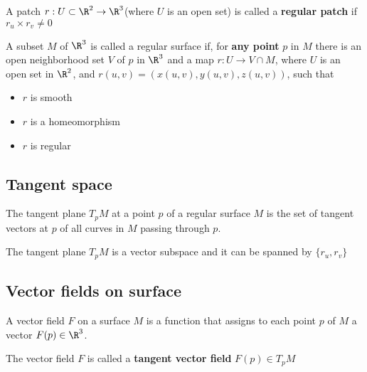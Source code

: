 \begin{refsection}
\begin{definition}\cite[135]{krim2015geometric}
A patch $r:U\subset \R^2 \to \R^3$(where $U$ is an open set) is called a \textbf{regular patch} if $r_u\times r_v \neq 0$
\end{definition}






\begin{definition}\cite[135]{krim2015geometric}
A subset $M$ of $\R^3$ is called a regular surface if, for \textbf{any point} $p$ in $M$ there is an open neighborhood set $V$ of $p$ in $\R^3$ and a map $r:U\to V\cap M$, where $U$ is an open set in $\R^2$, and $r(u,v)=(x(u,v),y(u,v),z(u,v))$, such that 
\begin{itemize}
    \item $r$ is smooth
    \item $r$ is a homeomorphism
    \item $r$ is regular
\end{itemize}
\end{definition}


\subsection{Tangent space}
\begin{definition}
The tangent plane $T_pM$ at a point $p$ of a regular surface $M$ is the set of tangent vectors at $p$ of all curves in $M$ passing through $p$.
\end{definition}

\begin{remark}
The tangent plane $T_pM$ is a vector subspace and it can be spanned by $\{r_u,r_v\}$
\end{remark}




\subsection{Vector fields on surface}


\begin{definition}
A vector field $F$ on a surface $M$ is a function that assigns to each point $p$ of $M$ a vector $F(p)\in \R^3$. 

The vector field $F$ is called a \textbf{tangent vector field} $F(p)\in T_pM$
\end{definition}






\end{refsection}
